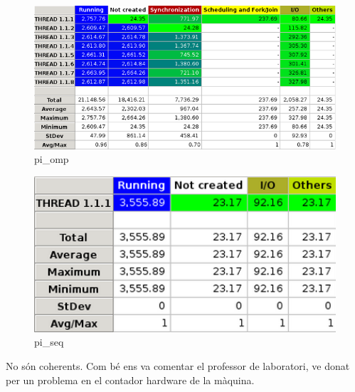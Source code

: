 \documentclass[a4paper,11pt]{article}
\begin{document}
\begin{enumerate}
          \begin{figure}[h!]
           \begin{center}
            \includegraphics[width=1\textwidth]{pregunta_6_omp.png}
            \caption{pi\_omp} 
            \end{center}
          \end{figure}

            \begin{figure}[h!]
            \begin{center}
              \includegraphics[width=1\textwidth]{pregunta_6_seq.png}
              \caption{pi\_seq} 
            \end{center}
          \end{figure}

          No són coherents. Com bé ens va comentar el professor de laboratori, ve donat per un problema en el contador hardware de la màquina.
          
      \end{enumerate}
  \clearpage
\end{document}
